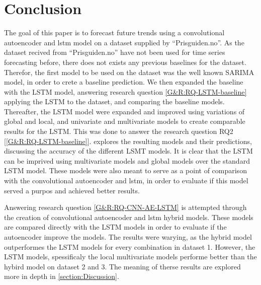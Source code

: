 \section{Conclusion}
\label{section:Discussion:Conclusion}



The goal of this paper is to forecast future trends using a convolutional autoencoder and lstm model
on a dataset supplied by ``Prisguiden.no''.
As the dataset recived from ``Prisguiden.no'' have not been used for time series forecasting before,
there does not exists any previous baselines for the dataset.
Therefor, the first model to be used on the dataset was the well known SARIMA model,
in order to crete a baseline prediction.
We then expanded the baseline with the LSTM model, answering research question \cref{G&R:RQ-LSTM-baseline}
applying the LSTM to the dataset, and comparing the baseline models.
Thereafter, the LSTM model were expanded and improved using variations of global and local, and univariate and multivariate models
to create comparable results for the LSTM.
This was done to answer the research question RQ2 [\ref{G&R:RQ-LSTM-baseline}].
 explores the resulting models and their predictions, discussing the accuracy of the different LSMT models.
It is clear that the LSTM can be imprived using multivariate models and global models over the standard LSTM model.
These models were also meant to serve as a point of comparison with the convolutional autoencoder and lstm,
in order to evaluate if this model served a purpos and achieved better results.

Answering research question \cref{G&R:RQ-CNN-AE-LSTM} is attempted through the creation of convolutional autoencoder and lstm hybrid models.
These models are compared directly with the LSTM models in order to evaluate if the autoencoder improve the models.
The results were warying, as the hybrid model outperformes the LSTM models for every combination in dataset 1.
However, the LSTM models, spessificaly the local multivariate models performe better than the hybird model on dataset 2 and 3.
The meaning of therse results are explored more in depth in \cref{section:Discussion}.

